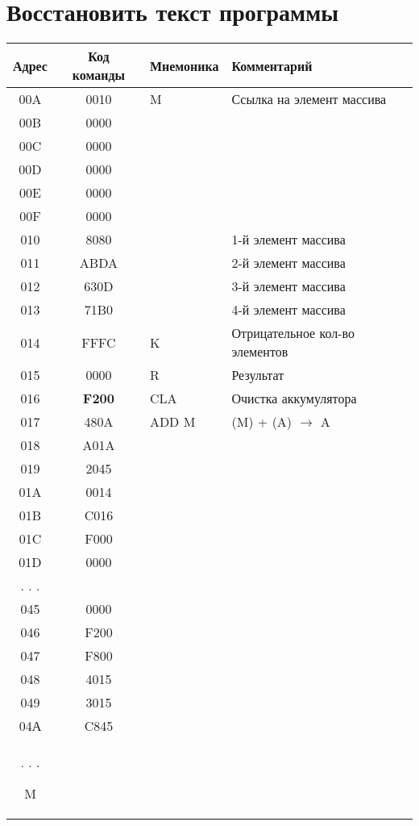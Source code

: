 \documentclass[a4paper,14pt]{article}
\begin{document}
\section{Восстановить текст программы}

\begin{tabular}{|c|c|l|l|}
\hline
\textbf{Адрес} & \textbf{Код команды} & \textbf{Мнемоника} & \textbf{Комментарий} \\\hline
00A & 0010 & M & Ссылка на элемент массива \\
00B & 0000 &  &  \\
00C & 0000 &  &  \\
00D & 0000 &  &  \\
00E & 0000 &  &  \\
00F & 0000 &  &  \\
010 & 8080 &  & 1-й элемент массива \\
011 & ABDA &  & 2-й элемент массива \\
012 & 630D &  & 3-й элемент массива \\
013 & 71B0 &  & 4-й элемент массива \\
014 & FFFC & K & Отрицательное кол-во элементов \\
015 & 0000 & R & Результат \\
016 & \textbf{F200} & CLA & Очистка аккумулятора \\
017 & 480A & ADD M & (M) + (A) $\to$ A \\
018 & A01A &  &  \\
019 & 2045 &  &  \\
01A & 0014 &  &  \\
01B & C016 &  &  \\
01C & F000 &  &  \\
01D & 0000 &  &  \\
. . . &  &  &  \\
045 & 0000 &  &  \\
046 & F200 &  &  \\
047 & F800 &  &  \\
048 & 4015 &  &  \\
049 & 3015 &  &  \\
04А & C845 &  &  \\

. . .







	M










\end{tabular}
\end{document}
